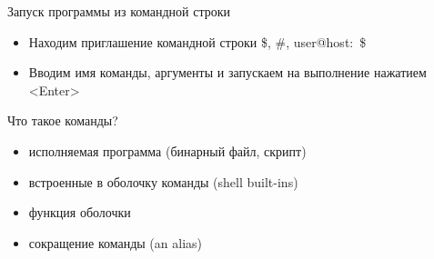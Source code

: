 \begin{frame}[fragile]{Запуск программы из командной строки}
  \begin{itemize}
    \item 
	Находим приглашение командной строки
	\$, \#, user@host:~\$
    \item
	Вводим имя команды, аргументы и запускаем на выполнение нажатием <Enter>
   \end{itemize}

	Что такое команды?
  \begin{itemize}
    \item исполняемая программа (бинарный файл, скрипт)
    \item встроенные в оболочку команды (shell built-ins)
    \item функция оболочки
    \item сокращение команды (an alias) 
  \end{itemize}
\end{frame}
